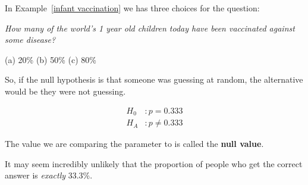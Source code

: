 \documentclass{beamer}
\begin{document}
\begin{frame}
  \begin{example}
    In Example~\ref{infant vaccination} we has three choices for the question:
    
    \vspace{1mm}
    \emph{How many of the world's 1 year old children today have been vaccinated against some disease?}

    \vspace{-2.5mm}
    \begin{center}
      (a) 20\%
      \qquad\quad
      (b) 50\%
      \qquad\quad
      (c) 80\%
    \end{center}\pause

    \vspace{-2mm}
    \pause
    \pause

    \vspace{1mm}
    So, if the null hypothesis is that someone was guessing at random, the alternative would be they were not guessing.\pause

    \vspace{-3mm}
    \begin{equation*}
      \begin{aligned}
        H_0 &: p = 0.333 \\
        H_A &: p \neq 0.333
      \end{aligned}
    \end{equation*}
  \end{example}\pause

  \begin{definition}
    The value we are comparing the parameter to is called the \textbf{null value}.
  \end{definition}
\end{frame}

\begin{frame}
  \begin{example}
    It may seem incredibly unlikely that the proportion of people who get the correct answer is \emph{exactly} 33.3\%.

    \vspace{1mm}
    \pause
  \end{example}
\end{frame}
\end{document}
